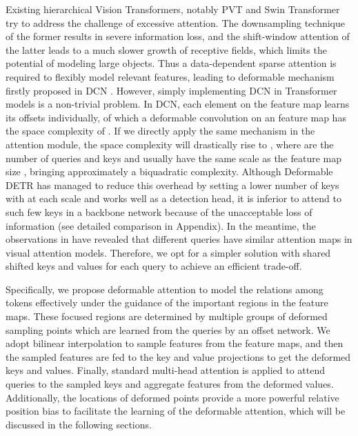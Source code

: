 Existing hierarchical Vision Transformers, notably PVT \cite{PVT} and Swin Transformer \cite{Swin} try to address the challenge of excessive attention. The downsampling technique of the former results in severe information loss, and the shift-window attention of the latter leads to a much slower growth of receptive fields, which limits the potential of modeling large objects. 
Thus a data-dependent sparse attention is required to flexibly model relevant features, leading to deformable mechanism firstly proposed in DCN \cite{DCNv1}. However, simply implementing DCN in Transformer models is a non-trivial problem.
In DCN, each element on the feature map learns its offsets individually, of which a  deformable convolution on an  feature map has the space complexity of . If we directly apply the same mechanism in  the attention module, the space complexity will drastically rise to , where  are the number of queries and keys and usually have the same scale as the feature map size , bringing approximately a biquadratic complexity.
Although Deformable DETR \cite{DeformableDETR} has managed to reduce this overhead by setting a lower number of keys with  at each scale and works well as a detection head, 
it is inferior to attend to such few keys in a backbone network because of the unacceptable loss
of information (see detailed comparison in Appendix). In the meantime, the observations in \cite{deepvit, gcnet} have revealed that different queries have similar attention maps in visual attention models. Therefore, we opt for a simpler solution with shared shifted keys and values for each query to achieve an efficient trade-off.




Specifically, we propose deformable attention to model the relations among tokens effectively under the guidance of the important regions in the feature maps. These focused regions are determined by multiple groups of deformed sampling points which are learned from the queries by an offset network. 
We adopt bilinear interpolation to sample features from the feature maps, and then the sampled features are fed to the key and value projections to get the deformed keys and values. Finally, standard multi-head attention is applied to attend queries to the sampled keys and aggregate features from the deformed values. Additionally, the locations of deformed points provide a more powerful relative position bias to facilitate the learning of the deformable attention, which will be discussed in the following sections. 

